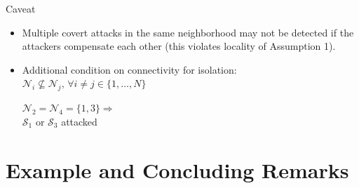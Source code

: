 \documentclass[presentation]{beamer}
\begin{document}
\begin{frame}[c]{Caveat}
\begin{itemize}
    \setlength{\itemsep}{2ex}    
    \item<1-> Multiple covert attacks in the same neighborhood may not be detected if the attackers compensate each other (this violates locality of Assumption 1).
    
    \item<2> Additional condition on connectivity for isolation: $\mathcal N_i \not\subseteq \mathcal N_j,\, \forall i \neq j \in \{1 ,\dots, N \} $\\[2ex]
    \begin{minipage}{0.48\linewidth}
        \centering
        \end{minipage}
        \begin{minipage}{0.48\linewidth}
            $\mathcal N_2 = \mathcal N_4 = \{1,3\} \Rightarrow$ \\
            $\mathcal S_1 \text{ or } \mathcal S_3$ attacked
        \end{minipage}
    
\end{itemize}
\end{frame}

\section{Example and Concluding Remarks}
 
\end{document}
